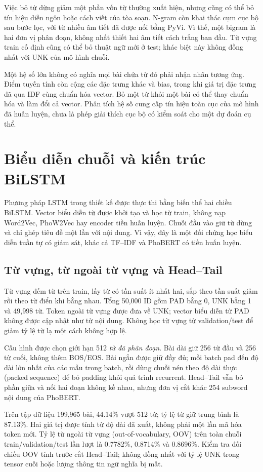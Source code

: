 Việc bỏ từ dừng giảm một phần vốn từ thường xuất hiện, nhưng cũng có thể bỏ tín hiệu diễn ngôn hoặc cách viết của tòa soạn. N-gram còn khai thác cụm cục bộ sau bước lọc, với từ nhiều âm tiết đã được nối bằng PyVi. Vì thế, một bigram là hai đơn vị phân đoạn, không nhất thiết hai âm tiết cách trắng ban đầu. Từ vựng train cố định cũng có thể bỏ thuật ngữ mới ở test; khác biệt này không đồng nhất với UNK của mô hình chuỗi.

Một hệ số lớn không có nghĩa mọi bài chứa từ đó phải nhận nhãn tương ứng. Điểm tuyến tính còn cộng các đặc trưng khác và bias, trong khi giá trị đặc trưng đã qua IDF cùng chuẩn hóa vector. Bỏ một từ khỏi một bài có thể thay chuẩn hóa và làm đổi cả vector. Phân tích hệ số cung cấp tín hiệu toàn cục của mô hình đã huấn luyện, chưa là phép giải thích cục bộ có kiểm soát cho một dự đoán cụ thể.
\FloatBarrier

\section{Biểu diễn chuỗi và kiến trúc BiLSTM}
\label{sec:bilstm}
Phương pháp LSTM trong thiết kế được thực thi bằng biến thể hai chiều BiLSTM. Vector biểu diễn từ được khởi tạo và học từ train, không nạp Word2Vec, PhoW2Vec hay encoder tiền huấn luyện. Chuỗi đầu vào giữ từ dừng và chỉ ghép tiêu đề một lần với nội dung. Vì vậy, đây là một đối chứng học biểu diễn tuần tự có giám sát, khác cả TF--IDF và PhoBERT có tiền huấn luyện.

\subsection{Từ vựng, từ ngoài từ vựng và Head--Tail}
Từ vựng đếm từ trên train, lấy từ có tần suất ít nhất hai, sắp theo tần suất giảm rồi theo từ điển khi bằng nhau. Tổng 50,000 ID gồm PAD bằng 0, UNK bằng 1 và 49,998 từ. Token ngoài từ vựng được đưa về UNK; vector biểu diễn từ PAD không được cập nhật như từ nội dung. Không học từ vựng từ validation/test để giảm tỷ lệ từ lạ một cách không hợp lệ.

Cấu hình được chọn giới hạn 512 \emph{từ đã phân đoạn}. Bài dài giữ 256 từ đầu và 256 từ cuối, không thêm BOS/EOS. Bài ngắn được giữ đầy đủ; mỗi batch pad đến độ dài lớn nhất của các mẫu trong batch, rồi dùng chuỗi nén theo độ dài thực (packed sequence) để bỏ padding khỏi quá trình recurrent. Head--Tail vẫn bỏ phần giữa và nối hai đoạn không kề nhau, nhưng đơn vị cắt khác 254 subword nội dung của PhoBERT.

Trên tập dữ liệu 199,965 bài, 44.14\% vượt 512 từ; tỷ lệ từ giữ trung bình là 87.13\%. Hai giá trị được tính từ độ dài đã xuất, không phải một lần mã hóa token mới. Tỷ lệ từ ngoài từ vựng (out-of-vocabulary, OOV) trên toàn chuỗi train/validation/test lần lượt là 0.7782\%, 0.8714\% và 0.8696\%. Kiểm tra đối chiếu OOV tính trước cắt Head--Tail; không đồng nhất với tỷ lệ UNK trong tensor cuối hoặc lượng thông tin ngữ nghĩa bị mất.


